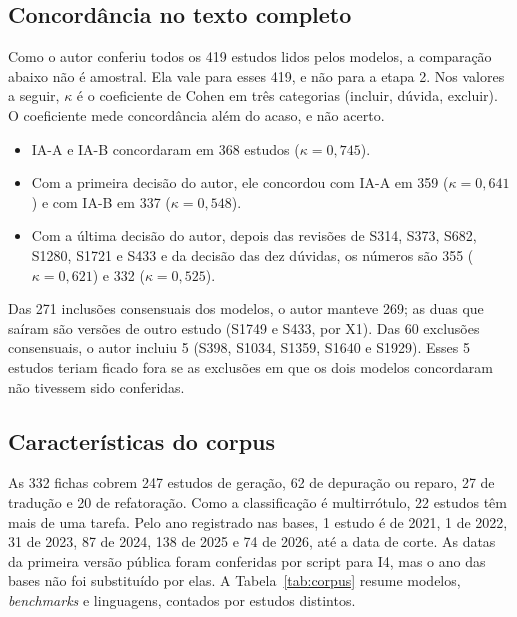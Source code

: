 \subsection{Concordância no texto completo}
Como o autor conferiu todos os 419 estudos lidos pelos modelos, a comparação abaixo não é amostral. Ela vale para
esses 419, e não para a etapa 2. Nos valores a seguir, $\kappa$ é o coeficiente
de Cohen em três categorias (incluir, dúvida, excluir). O coeficiente mede concordância além do acaso, e não acerto.
\begin{itemize}
  \item IA-A e IA-B concordaram em 368 estudos ($\kappa = 0{,}745$).
  \item Com a primeira decisão do autor, ele concordou com IA-A em 359 ($\kappa = 0{,}641$) e com IA-B em 337
  ($\kappa = 0{,}548$).
  \item Com a última decisão do autor, depois das revisões de S314, S373, S682, S1280, S1721 e S433
  e da decisão das dez dúvidas, os números são 355 ($\kappa = 0{,}621$) e 332 ($\kappa = 0{,}525$).
\end{itemize}
Das 271 inclusões consensuais dos modelos, o autor manteve 269; as duas que saíram são versões de outro estudo
(S1749 e S433, por X1). Das 60 exclusões consensuais, o autor incluiu 5 (S398, S1034, S1359, S1640 e S1929). Esses
5 estudos teriam ficado fora se as exclusões em que os dois modelos concordaram
não tivessem sido conferidas.

\subsection{Características do corpus}\label{sec:corpus}
As 332 fichas cobrem 247 estudos de geração, 62 de depuração ou reparo, 27 de tradução e 20 de refatoração. Como a
classificação é multirrótulo, 22 estudos têm mais de uma tarefa. Pelo ano registrado nas bases, 1 estudo é de 2021,
1 de 2022, 31 de 2023, 87 de 2024, 138 de 2025 e 74 de 2026, até a data de corte. As datas da primeira versão
pública foram conferidas por script para I4, mas o ano das bases não foi substituído por elas. A
Tabela~\ref{tab:corpus} resume modelos, \textit{benchmarks} e linguagens, contados por estudos distintos.

